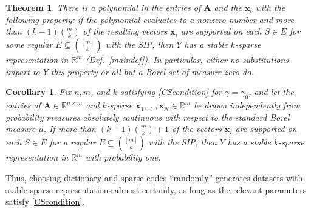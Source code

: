 \documentclass[9pt,twocolumn]{pnas-new}
\newtheorem{theorem}{Theorem}
\newtheorem{corollary}{Corollary}
\begin{document}
\begin{theorem}\label{robustPolythm} %
There is a polynomial in the entries of $\mathbf{A}$ and the $\mathbf{x}_i$ with the following property:  if the polynomial evaluates to a nonzero number and more than \mbox{$(k-1){m \choose k}$} of the resulting vectors $\mathbf{x}_i$ are supported on each $S \in E$ for some regular $E \subseteq {[m] \choose k}$ with the SIP, then $Y$ has a stable $k$-sparse representation in $\mathbb{R}^m$ (Def.~\ref{maindef}). In particular, either no substitutions impart to $Y$ this property or all but a Borel set of measure zero do. 
\end{theorem}


\begin{corollary}\label{ProbabilisticCor}
Fix $n, m$, and $k$ satisfying \eqref{CScondition} for $\gamma = \gamma_0$, and let the entries of $\mathbf{A} \in \mathbb{R}^{n \times m}$ and $k$-sparse $\mathbf{x}_1, \ldots, \mathbf{x}_N \in \mathbb{R}^m$ be drawn independently from probability measures absolutely continuous with respect to the standard Borel measure $\mu$. If more than $(k-1){m \choose k} + 1$ of the vectors $\mathbf{x}_i$ are supported on each $S \in E$ for a regular $E \subseteq {[m] \choose k}$ with the SIP, then $Y$ has a stable $k$-sparse representation in $\mathbb{R}^m$ with probability one.
\end{corollary}

Thus, choosing dictionary and sparse codes ``randomly'' generates datasets with stable sparse representations almost certainly, as long as the relevant parameters satisfy \eqref{CScondition}.


\end{document}
